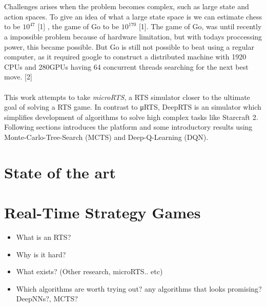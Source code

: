 \documentclass[fleqn,10pt]{SelfArx} %
\begin{document}
\\
\\
Challenges arises when the problem becomes complex, such as large state and action spaces. To give an idea of what a large state space is we can estimate chess to be $10^{47}$ [1] , the game of Go to be $10^{170}$ [1]. The game of Go, was until recently a impossible problem because of hardware limitation, but with todays proccessing power, this became possible. But Go is still not possible to beat using a regular computer, as it required google to construct a distributed machine with 1920 CPUs  and 280GPUs having 64 concurrent threads  searching for the next best move. [2]
\\
\\

This work attempts to take \textit{microRTS}, a RTS simulator closer to the ultimate goal of solving a RTS game. In contrast to μRTS, DeepRTS is an simulator which simplifies development of algorithms to solve high complex tasks like Starcraft 2. Following sections introduces the platform and some introductory results using Monte-Carlo-Tree-Search (MCTS) and Deep-Q-Learning (DQN).

\section{State of the art} %


\section{Real-Time Strategy Games}
\begin{itemize}
    \item What is an RTS?
    \item Why is it hard?
    \item What exists? (Other research, microRTS.. etc)
    \item Which algorithms are worth trying out? any algorithms that looks promising? DeepNNs?, MCTS?
\end{itemize}
\end{document}
